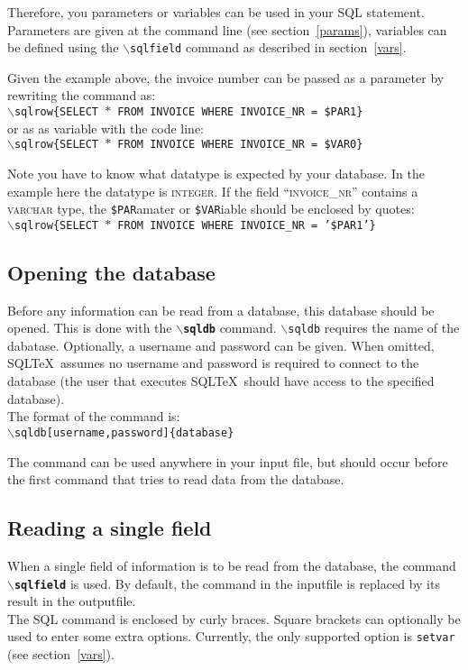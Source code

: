 \documentclass{article}
\newcommand{\bs}{\ensuremath{\backslash}}
\newcommand{\vs}{\vspace{3mm}}
\begin{document}
\vs

Therefore, you parameters or variables can be used in your SQL statement. Parameters are given at the command
line (see section~\ref{params}), variables can be defined using the \texttt{\bs sqlfield} command as
described in section~\ref{vars}.

Given the example above, the invoice number can be passed as a parameter by rewriting the command as: \\
\texttt{\bs sqlrow\{SELECT $\ast$ FROM INVOICE WHERE INVOICE\_NR = \$PAR1\}} \\
or as as variable with the code line: \\
\texttt{\bs sqlrow\{SELECT $\ast$ FROM INVOICE WHERE INVOICE\_NR = \$VAR0\}}

Note you have to know what datatype is expected by your database. In the example here the datatype is
\textsc{integer}. If the field ``\textsc{invoice\_nr}'' contains a \textsc{varchar} type, the
\texttt{\$PAR}amater or \texttt{\$VAR}iable should be enclosed by quotes: \\
\texttt{\bs sqlrow\{SELECT $\ast$ FROM INVOICE WHERE INVOICE\_NR = '\$PAR1'\}}

\subsection{Opening the database}

Before any information can be read from a database, this database should be opened.
This is done with the \texttt{\textbf{\bs sqldb}} command.
\texttt{\bs sqldb} requires the name of the dabatase. Optionally, a username and password can be given. When
omitted, SQL\TeX\ assumes no username and password is required to connect to the database (the user that
executes SQL\TeX\ should have access to the specified database). \\
The format of the command is:\\
\texttt{\bs sqldb[username,password]\{database\}}

The command can be used anywhere in your input file, but should occur before the first command that tries to
read data from the database.

\subsection{Reading a single field}\label{sqlfield}

When a single field of information is to be read from the database, the command \texttt{\textbf{\bs sqlfield}}
is used. By default, the command in the inputfile is replaced by its result in the outputfile.\\
The SQL command is enclosed by curly braces. Square brackets can optionally be used to enter some extra options.
Currently, the only supported option is \texttt{setvar} (see section~\ref{vars}).
\end{document}
